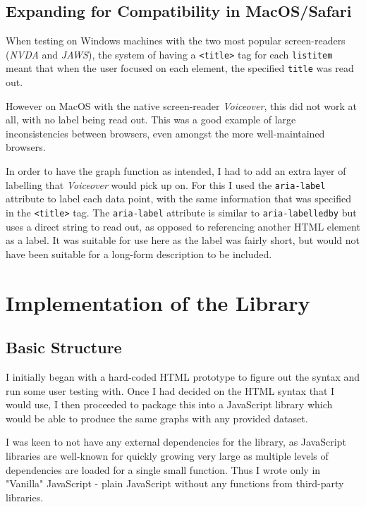 \documentclass[ %
                    author={Aleena Baig},
                supervisor={Dr Simon Lock},
                    degree={BSc},
                     title={On Making Web Accessible Graphs},
                  subtitle={},
                      year={2019} ]{dissertation}
\begin{document}
\subsection{Expanding for Compatibility in MacOS/Safari}

When testing on Windows machines with the two most popular screen-readers (\textit{NVDA} and \textit{JAWS}), the system of having a \texttt{<title>} tag for each \texttt{listitem} meant that when the user focused on each element, the specified \texttt{title} was read out.

However on MacOS with the native screen-reader \textit{Voiceover}, this did not work at all, with no label being read out. This was a good example of large inconsistencies between browsers, even amongst the more well-maintained browsers.

In order to have the graph function as intended, I had to add an extra layer of labelling that \textit{Voiceover} would pick up on. For this I used the \texttt{aria-label} attribute to label each data point, with the same information that was specified in the \texttt{<title>} tag. The \texttt{aria-label} attribute is similar to \texttt{aria-labelledby} but uses a direct string to read out, as opposed to referencing another HTML element as a label. It was suitable for use here as the label was fairly short, but would not have been suitable for a long-form description to be included.

\section{Implementation of the Library}

\subsection{Basic Structure}

I initially began with a hard-coded HTML prototype to figure out the syntax and run some user testing with. Once I had decided on the HTML syntax that I would use, I then proceeded to package this into a JavaScript library which would be able to produce the same graphs with any provided dataset.

I was keen to not have any external dependencies for the library, as JavaScript libraries are well-known for quickly growing very large as multiple levels of dependencies are loaded for a single small function.\cite{jsdependencies} Thus I wrote only in "Vanilla" JavaScript - plain JavaScript without any functions from third-party libraries.
\end{document}
